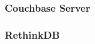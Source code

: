 \documentclass[a4paper,12pt]{article}
\begin{document}
	\subsubsection{Couchbase Server}
		
	\subsubsection{RethinkDB}
				
	\paragraph{}
	
\label{semi-structure-data}
\end{document}
